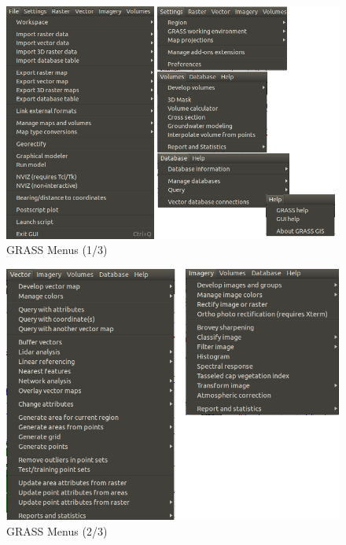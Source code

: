 \begin{figure}[htbp]
   \centering
   \includegraphics[scale=0.4]{grass025.png}
   \caption{GRASS Menus (1/3)}
   \label{fig:grass025}
\end{figure}

\begin{figure}[htbp]
   \centering
   \includegraphics[scale=0.4]{grass026.png}
   \caption{GRASS Menus (2/3)}
   \label{fig:grass026}
\end{figure}

